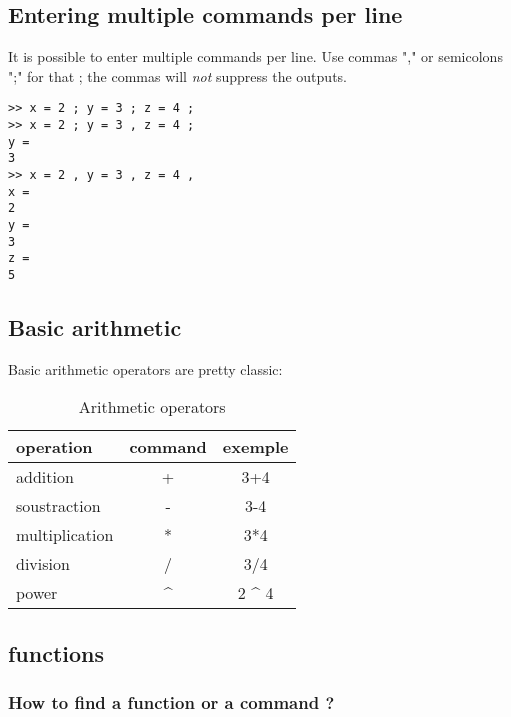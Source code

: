 \subsection{Entering multiple commands per line}
It is possible to enter multiple commands per line. 
Use commas "," or semicolons ";" for that ; the commas will \emph{not} suppress the outputs.


\begin{lstlisting}
>> x = 2 ; y = 3 ; z = 4 ;
>> x = 2 ; y = 3 , z = 4 ;
y = 
3
>> x = 2 , y = 3 , z = 4 ,
x = 
2
y = 
3
z = 
5
\end{lstlisting}



\subsection{Basic arithmetic}


Basic arithmetic operators are pretty classic:

\begin{table}[h!]\caption{Arithmetic operators}
\center
\begin{tabular}{|l|c|c|}
	\hline
	operation & command & exemple \\
	\hline
	addition & + & 3+4 \\
	soustraction & - & 3-4 \\
 	multiplication & * & 3*4 \\
	division & / & 3/4 \\
	power & \^{} & 2 \^{} 4 \\
	\hline
\end{tabular}
\end{table}




\subsection{functions}
\subsubsection{How to find a function or a command ?}

